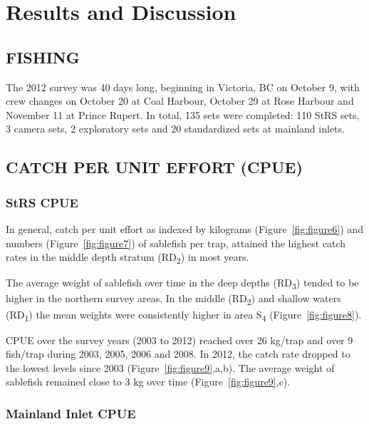 \documentclass[12pt]{article}\usepackage[]{graphicx}\usepackage[]{color}
\begin{document}
\hypertarget{results-and-discussion}{%
\section{Results and Discussion}\label{results-and-discussion}}

\hypertarget{fishing}{%
\subsection{FISHING}\label{fishing}}

The 2012 survey was 40 days long, beginning in Victoria, BC on October 9, with crew changes on October 20 at Coal Harbour, October 29 at Rose Harbour and November 11 at Prince Rupert. In total, 135 sets were completed: 110 StRS sets, 3 camera sets, 2 exploratory sets and 20 standardized sets at mainland inlets.

\hypertarget{catch-per-unit-effort-cpue}{%
\subsection{CATCH PER UNIT EFFORT (CPUE)}\label{catch-per-unit-effort-cpue}}

\hypertarget{strs-cpue}{%
\subsubsection{StRS CPUE}\label{strs-cpue}}

In general, catch per unit effort as indexed by kilograms (Figure~\ref{fig:figure6}) and numbers (Figure~\ref{fig:figure7}) of sablefish per trap, attained the highest catch rates in the middle depth stratum (RD\textsubscript{2}) in most years.

The average weight of sablefish over time in the deep depths (RD\textsubscript{3}) tended to be higher in the northern survey areas. In the middle (RD\textsubscript{2}) and shallow waters (RD\textsubscript{1}) the mean weights were consistently higher in area S\textsubscript{4} (Figure~\ref{fig:figure8}).

CPUE over the survey years (2003 to 2012) reached over 26 kg/trap and over 9 fish/trap during 2003, 2005, 2006 and 2008. In 2012, the catch rate dropped to the lowest levels since 2003 (Figure~\ref{fig:figure9},a,b). The average weight of sablefish remained close to 3 kg over time (Figure~\ref{fig:figure9},c).

\hypertarget{mainland-inlet-cpue}{%
\subsubsection{Mainland Inlet CPUE}\label{mainland-inlet-cpue}}
\end{document}
